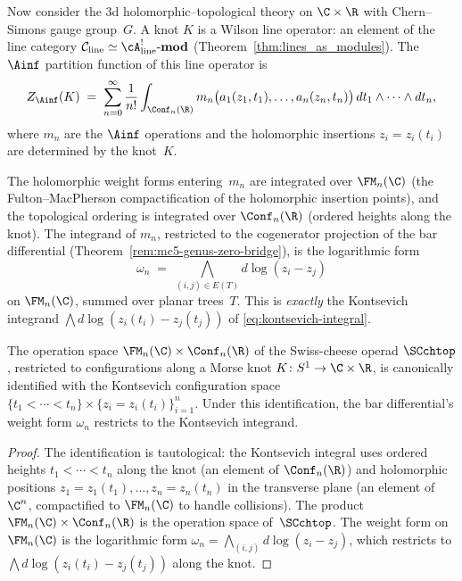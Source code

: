 Now consider the 3d holomorphic--topological theory on
$\C \times \R$ with Chern--Simons gauge group~$G$. A knot
$K$ is a Wilson line operator: an element of the line category
$\mathcal{C}_{\mathrm{line}} \simeq \cA^!_{\mathrm{line}}\text{-}\mathbf{mod}$
(Theorem~\ref{thm:lines_as_modules}). The $\Ainf$ partition
function of this line operator is
\begin{equation}
\label{eq:ainfty-partition}
Z_{\Ainf}(K) \;=\; \sum_{n=0}^{\infty} \frac{1}{n!}
\int_{\Conf_n(\R)}
m_n\bigl(a_1(z_1,t_1), \ldots, a_n(z_n,t_n)\bigr)\,
dt_1 \wedge \cdots \wedge dt_n,
\end{equation}
where $m_n$ are the $\Ainf$ operations and the holomorphic
insertions $z_i = z_i(t_i)$ are determined by the knot~$K$.

The holomorphic weight forms entering~$m_n$
are integrated over $\FM_n(\C)$ (the Fulton--MacPherson
compactification of the holomorphic insertion points), and the
topological ordering is integrated over $\Conf_n(\R)$ (ordered
heights along the knot). The integrand of $m_n$, restricted to
the cogenerator projection of the bar differential
(Theorem~\ref{rem:mc5-genus-zero-bridge}), is the logarithmic
form
\[
\omega_n \;=\; \bigwedge_{(i,j) \in E(T)} d\log(z_i - z_j)
\]
on $\FM_n(\C)$, summed over planar trees~$T$. This is
\emph{exactly} the Kontsevich integrand
$\bigwedge d\log(z_i(t_i) - z_j(t_j))$ of
\eqref{eq:kontsevich-integral}.

\begin{proposition}
\label{prop:config-space-id}
The operation space $\FM_n(\C) \times \Conf_n(\R)$ of the
Swiss-cheese operad $\SCchtop$, restricted to configurations
along a Morse knot $K \colon S^1 \to \C \times \R$, is
canonically identified with the Kontsevich configuration space
$\{t_1 < \cdots < t_n\} \times \{z_i = z_i(t_i)\}_{i=1}^n$.
Under this identification, the bar differential's weight form
$\omega_n$ restricts to the Kontsevich integrand.
\end{proposition}

\begin{proof}
The identification is tautological: the Kontsevich
integral uses ordered heights $t_1 < \cdots < t_n$ along the
knot (an element of $\Conf_n(\R)$) and holomorphic positions
$z_1 = z_1(t_1), \ldots, z_n = z_n(t_n)$ in the transverse
plane (an element of $\C^n$, compactified to $\FM_n(\C)$ to
handle collisions). The product
$\FM_n(\C) \times \Conf_n(\R)$ is the operation space
of~$\SCchtop$. The weight form on $\FM_n(\C)$ is the
logarithmic form $\omega_n = \bigwedge_{(i,j)} d\log(z_i - z_j)$,
which restricts to $\bigwedge d\log(z_i(t_i) - z_j(t_j))$ along
the knot.
\end{proof}


